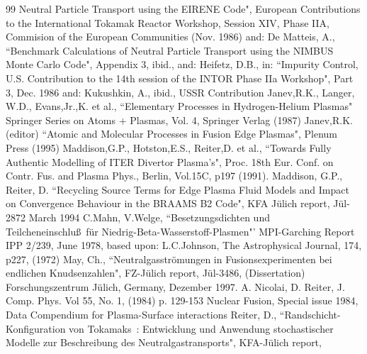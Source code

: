 \begin{thebibliography}{99}
Neutral Particle Transport using the EIRENE Code", European Contributions
to the International Tokamak Reactor Workshop, Session XIV, Phase IIA,
Commision of the European Communities (Nov. 1986) and:
De Matteis, A., ``Benchmark Calculations of Neutral Particle Transport using
the NIMBUS Monte Carlo Code", Appendix 3, ibid.,
and:
Heifetz, D.B., in: ``Impurity Control, U.S. Contribution to the 14th session
of the INTOR Phase IIa Workshop", Part 3, Dec. 1986
and:
Kukushkin, A., ibid., USSR Contribution
 Janev,R.K., Langer, W.D., Evans,Jr.,K. et al.,
                   ``Elementary Processes in Hydrogen-Helium Plasmas"
                   Springer Series on Atoms + Plasmas,
                   Vol. 4, Springer Verlag (1987)
 Janev,R.K. (editor) ``Atomic and Molecular
                     Processes in Fusion Edge Plasmas", Plenum Press
                     (1995)
 Maddison,G.P., Hotston,E.S., Reiter,D. et al.,
                        ``Towards Fully
                        Authentic Modelling of ITER Divertor Plasma's",
                        Proc. 18th Eur. Conf. on
                        Contr. Fus. and Plasma Phys.,
                        Berlin, Vol.15C, p197 (1991).
 Maddison, G.P., Reiter, D.
                    ``Recycling Source Terms for Edge Plasma Fluid Models and
                      Impact on Convergence Behaviour in the BRAAMS B2 Code",
                       KFA J\"ulich report, J\"ul-2872
                       March 1994
 C.Mahn, V.Welge, ``Besetzungsdichten und Teilcheneinschlu\ss \
                          f\"ur Niedrig-Beta-Wasserstoff-Plasmen"'
                          MPI-Garching Report IPP 2/239, June 1978, based upon:
                  L.C.Johnson, The Astrophysical Journal, 174, p227, (1972)
\bibitem{kn:May}  May, Ch., ``Neutralgasstr\"omungen in Fusionsexperimenten bei
                  endlichen Knudsenzahlen", FZ-J\"ulich report, J\"ul-3486,
                  (Dissertation)
                  Forschungszentrum J\"ulich, Germany, Dezember 1997.
\bibitem{kn:Nicolai} A. Nicolai, D. Reiter, J. Comp. Phys. Vol 55,
                     No. 1, (1984) p. 129-153
 Nuclear Fusion, Special issue 1984, Data Compendium
                     for Plasma-Surface interactions
  Reiter, D., ``Randschicht-Konfiguration von
                        Tokamaks~: Entwicklung und Anwendung
                        stochastischer Modelle zur Beschreibung des
                        Neutralgastransports", KFA-J\"ulich report,

\end{thebibliography}
